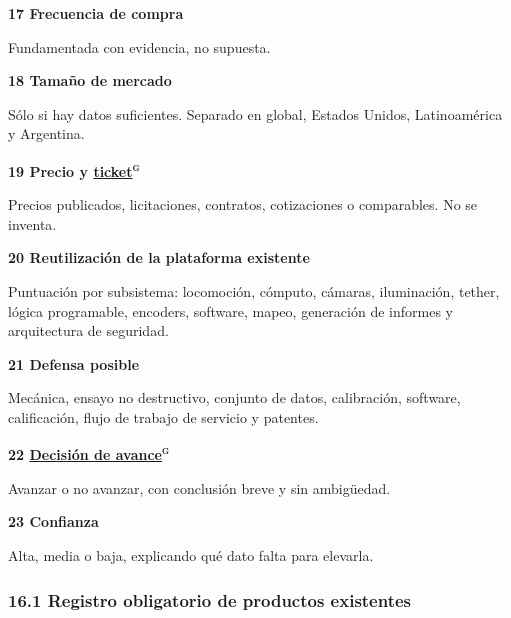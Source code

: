 \documentclass[11pt,a4paper]{article}
\newenvironment{tarjeta}[2]
  {\begin{tarjetabase}%
   {\sffamily\bfseries\color{navy}#1}%
   \ifstrempty{#2}{}{\\[1pt]{\sffamily\scriptsize\color{gray2}#2}}%
   \par\vspace{3pt}}
  {\end{tarjetabase}}
\begin{document}
\begin{tarjeta}{17 \textperiodcentered{} Frecuencia de compra}{}
Fundamentada con evidencia, no supuesta.

\end{tarjeta}
\begin{tarjeta}{18 \textperiodcentered{} Tamaño de mercado}{}
Sólo si hay datos suficientes. Separado en global, Estados Unidos, Latinoamérica y Argentina.

\end{tarjeta}
\begin{tarjeta}{19 \textperiodcentered{} Precio y \hyperlink{g-ticket}{ticket}\textsuperscript{\textsc{g}}}{}
Precios publicados, licitaciones, contratos, cotizaciones o comparables. No se inventa.

\end{tarjeta}
\begin{tarjeta}{20 \textperiodcentered{} Reutilización de la plataforma existente}{}
Puntuación por subsistema: locomoción, cómputo, cámaras, iluminación, tether, lógica programable, encoders, software, mapeo, generación de informes y arquitectura de seguridad.

\end{tarjeta}
\begin{tarjeta}{21 \textperiodcentered{} Defensa posible}{}
Mecánica, ensayo no destructivo, conjunto de datos, calibración, software, calificación, flujo de trabajo de servicio y patentes.

\end{tarjeta}
\begin{tarjeta}{22 \textperiodcentered{} \hyperlink{g-go-nogo}{Decisión de avance}\textsuperscript{\textsc{g}}}{}
Avanzar o no avanzar, con conclusión breve y sin ambigüedad.

\end{tarjeta}
\begin{tarjeta}{23 \textperiodcentered{} Confianza}{}
Alta, media o baja, explicando qué dato falta para elevarla.

\end{tarjeta}

\subsubsection*{16.1 Registro obligatorio de productos existentes}
\end{document}
